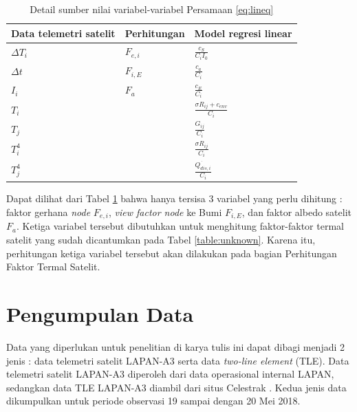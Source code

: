 \begin{table}[!ht]
\begin{center}
	\caption{Detail sumber nilai variabel-variabel Persamaan \ref{eq:lineq}}
\label{table:variabellist}
\begin{tabular}{|l|l|l|}
\hline
Data telemetri satelit & Perhitungan & Model regresi linear                  \\ \hline
$\Delta T_{i}$         & $F_{e,i}$   & $\frac{c_S}{C_iI_0}$                  \\ \hline
$\Delta t$             & $F_{i,E}$   & $\frac{c_a}{C_i}$                     \\ \hline
$I_i$                  & $F_{a}$     & $\frac{c_E}{C_i}$                     \\ \hline
$T_i$                  &             & $\frac{\sigma R_{ij} + c_{env}}{C_i}$ \\ \hline
$T_j$                  &             & $\frac{G_{ij}}{C_i}$                  \\ \hline
$T_i^4$             &             & $\frac{\sigma R_{ij}}{C_i}$           \\ \hline
$T_j^4$             &             & $\frac{\dot{Q_{dis,i}}}{C_i}$         \\ \hline
\end{tabular}
\end{center}
\vspace{-5mm}
\end{table}

Dapat dilihat dari Tabel \ref{table:variabellist} bahwa hanya tersisa 3
variabel yang perlu dihitung : faktor gerhana \textit{node} $F_{e,i}$,
\textit{view factor node} ke Bumi $F_{i,E}$, dan faktor albedo satelit $F_{a}$. Ketiga
variabel tersebut dibutuhkan untuk menghitung faktor-faktor termal satelit yang
sudah dicantumkan pada Tabel \ref{table:unknown}. Karena itu, perhitungan ketiga variabel tersebut akan dilakukan pada bagian Perhitungan Faktor Termal Satelit.

\section{Pengumpulan Data}

Data yang diperlukan untuk penelitian di karya tulis ini dapat dibagi menjadi 2 jenis : data
telemetri satelit LAPAN-A3 serta data \textit{two-line element} (TLE). Data
telemetri satelit LAPAN-A3 diperoleh dari data operasional internal LAPAN,
sedangkan data TLE LAPAN-A3 diambil dari situs Celestrak \cite{kelso}. Kedua
jenis data dikumpulkan untuk periode observasi 19 sampai dengan 20 Mei 2018.


